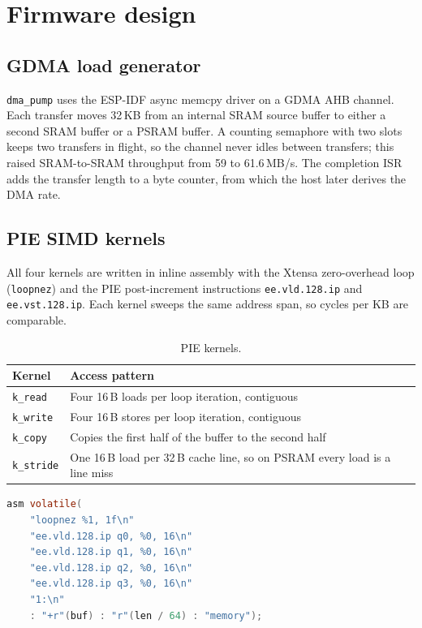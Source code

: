 \documentclass[11pt,a4paper]{article}
\begin{document}
\section{Firmware design}
\subsection{GDMA load generator}
\texttt{dma\_pump} uses the ESP-IDF async memcpy driver on a GDMA AHB channel. Each transfer moves
32\,KB from an internal SRAM source buffer to either a second SRAM buffer or a PSRAM buffer. A counting
semaphore with two slots keeps two transfers in flight, so the channel never idles between
transfers; this raised SRAM-to-SRAM throughput from 59 to 61.6\,MB/s. The completion ISR adds the
transfer length to a byte counter, from which the host later derives the DMA rate.

\subsection{PIE SIMD kernels}
All four kernels are written in inline assembly with the Xtensa zero-overhead loop
(\texttt{loopnez}) and the PIE post-increment instructions \texttt{ee.vld.128.ip} and
\texttt{ee.vst.128.ip}. Each kernel sweeps the same address span, so cycles per KB are comparable.

\begin{table}[h]
\centering
\begin{tabularx}{\linewidth}{@{}lX@{}}
\toprule
Kernel & Access pattern \\
\midrule
\texttt{k\_read}   & Four 16\,B loads per loop iteration, contiguous \\
\texttt{k\_write}  & Four 16\,B stores per loop iteration, contiguous \\
\texttt{k\_copy}   & Copies the first half of the buffer to the second half \\
\texttt{k\_stride} & One 16\,B load per 32\,B cache line, so on PSRAM every load is a line miss \\
\bottomrule
\end{tabularx}
\caption{PIE kernels.}
\end{table}

\begin{lstlisting}[language=C, caption={Read kernel.}]
asm volatile(
    "loopnez %1, 1f\n"
    "ee.vld.128.ip q0, %0, 16\n"
    "ee.vld.128.ip q1, %0, 16\n"
    "ee.vld.128.ip q2, %0, 16\n"
    "ee.vld.128.ip q3, %0, 16\n"
    "1:\n"
    : "+r"(buf) : "r"(len / 64) : "memory");
\end{lstlisting}
\end{document}

